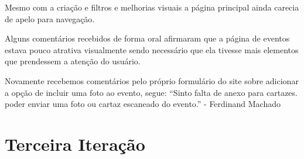 \par Mesmo com a criação e filtros e melhorias visuais a página principal ainda carecia de apelo para navegação.
\par Alguns comentários recebidos de forma oral afirmaram que a página de eventos estava pouco atrativa visualmente sendo necessário que ela tivesse mais elementos que prendessem a atenção do usuário.

\par Novamente recebemos comentários pelo próprio formulário do site sobre adicionar a opção de incluir uma foto ao evento, segue: ``Sinto falta de anexo para cartazes. poder enviar uma foto ou cartaz escaneado do evento.'' - Ferdinand Machado

\section{Terceira Iteração}
